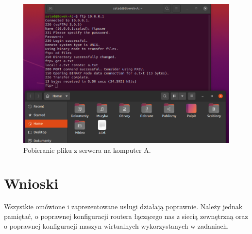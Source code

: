 \documentclass{article}
\begin{document}
\begin{figure}[H]
    \centering
    \includegraphics[totalheight=6cm]{ftp/dziala_dowody.png}  
    \caption{Pobieranie pliku z serwera na komputer A.}
    \label{5}
\end{figure}



\section{Wnioski}
Wszystkie omówione i zaprezentowane usługi działają poprawnie. Należy jednak pamiętać, o poprawnej konfiguracji routera łączącego nas z siecią zewnętrzną oraz o poprawnej konfiguracji maszyn wirtualnych wykorzystanych w zadaniach.
\end{document}
